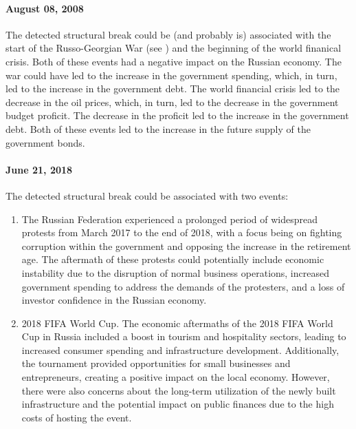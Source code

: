             \paragraph{August 08, 2008} The detected structural break could be (and probably is) associated with the start of the 
            Russo-Georgian War (see \cite{Wiki2008}) and the beginning of the world finanical crisis. Both of these events had 
            a negative impact on the Russian economy. The war could have led to the increase in the government spending, which, 
            in turn, led to the increase in the government debt. The world financial crisis led to the decrease in the oil prices, 
            which, in turn, led to the decrease in the government budget proficit. The decrease in the proficit led to the increase 
            in the government debt. Both of these events led to the increase in the future supply of the government bonds. 
            \paragraph{June 21, 2018} The detected structural break could be associated with two events:
            \begin{enumerate}
                \item The Russian Federation experienced a prolonged period of widespread protests from March 2017 to the end of 
                2018, with a focus being on fighting corruption within the government and opposing the increase in the retirement age. 
                The aftermath of these protests could potentially include economic instability due to the disruption of normal business
                operations, increased government spending to address the demands of the protesters, and a loss of investor confidence in 
                the Russian economy. 
                \item 2018 FIFA World Cup. The economic aftermaths of the 2018 FIFA World Cup in Russia included a boost in tourism and 
                hospitality sectors, leading to increased consumer spending and infrastructure development. Additionally, the tournament 
                provided opportunities for small businesses and entrepreneurs, creating a positive impact on the local economy. However, 
                there were also concerns about the long-term utilization of the newly built infrastructure and the potential impact on 
                public finances due to the high costs of hosting the event. 
            \end{enumerate} 
